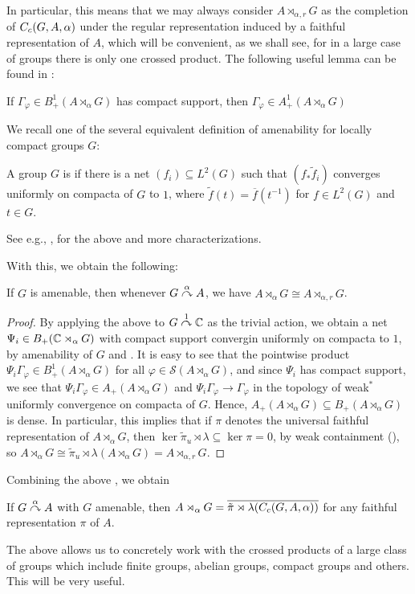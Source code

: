 In particular, this means that we may always consider $A \rtimes_{\alpha,r}G$ as the completion of $C_c(G,A,\alpha)$ under the regular representation induced by a faithful representation of $A$, which will be convenient, as we shall see, for in a large case of groups there is only one crossed product. The following useful lemma can be found in \cite[Lemma 7.7.6]{pedersenalgauto}:
\begin{lemma}
	If $\Gamma_\varphi \in B_+^1(A \rtimes_\alpha G)$ has compact support, then $\Gamma_\varphi \in A_+^1(A \rtimes_\alpha G)$
	\label{crossed:compactposdef}
\end{lemma}

We recall one of the several equivalent definition of amenability for locally compact groups $G$:
\begin{definition}
	A group $G$ is  if there is a net $(f_i) \subseteq L^2(G)$ such that $(f_ \ast \tilde f_i)$ converges uniformly on compacta of $G$ to $1$, where $\tilde f (t) = \overline f(t^{-1})$ for $f \in L^2(G)$ and $t \in G$.
\end{definition}
See e.g., \cite[Appendix G]{bekka2008kazhdan}, \cite[Proposition 7.3.7 and 7.3.8]{pedersenalgauto} for the above and more characterizations. 

With this, we obtain the following:
\begin{theorem}
	If $G$ is amenable, then whenever $G \stackrel{\alpha}{\curvearrowright} A$, we have $A \rtimes_\alpha G \cong A \rtimes_{\alpha,r}G$.
	\label{cross:amenable}
\end{theorem}
\begin{proof}
	By applying the above to $G \stackrel{1}{\curvearrowright} \mathbb{C}$ as the trivial action, we obtain a net $\Psi_i \in B_{+}(\mathbb{C} \rtimes_\alpha G)$ with compact support convergin uniformly on compacta to $1$, by amenability of $G$ and \cite[Lemma 7.2.4]{pedersenalgauto}. It is easy to see that the pointwise product $\Psi_i \Gamma_\varphi \in B_+^1(A \rtimes_\alpha G)$ for all $\varphi \in \mathcal{S}(A \rtimes_\alpha G)$, and since $\Psi_i$ has compact support, we see that $\Psi_i \Gamma_\varphi \in A_+(A \rtimes_\alpha G)$ and $\Psi_i \Gamma_\varphi \to \Gamma_\varphi$ in the topology of weak$^*$ uniformly convergence on compacta of $G$. Hence, $A_+(A \rtimes_\alpha G) \subseteq B_+(A \rtimes_\alpha G)$ is dense. In particular, this implies that if $\pi$ denotes the universal faithful representation of $A \rtimes_\alpha G$, then $\ker \tilde \pi_u \rtimes \lambda \subseteq \ker \pi = 0$, by weak containment (\cite[80]{dixmier1969c}), so $A \rtimes_\alpha G \cong \tilde \pi_u \rtimes \lambda( A \rtimes_\alpha G) = A \rtimes_{\alpha,r}G$.
\end{proof}
Combining the above , we obtain
\begin{corollary}
	If $G \stackrel{\alpha}{\curvearrowright} A$ with $G$ amenable, then $A \rtimes_\alpha G = \overline{\tilde \pi \rtimes \lambda (C_c(G,A,\alpha))}$ for any faithful representation $\pi$ of $A$.
\end{corollary}
The above allows us to concretely work with the crossed products of a large class of groups which include finite groups, abelian groups, compact groups and others. This will be very useful.

